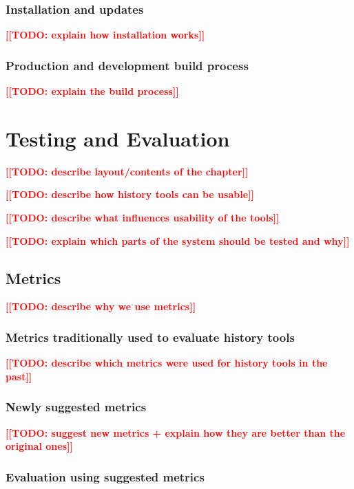 \documentclass[thesis=M,english]{FITthesis}[2012/10/20]
\newcommand{\todotext}[1]{\textcolor{red}{\textbf{[[#1]]}}}
\newcommand{\blind}[1][1]{\textcolor{mygray}{\Blindtext[#1][1]}}
\begin{document}
\blind

\subsection{Installation and updates}
\todotext{TODO: explain how installation works}

\blind

\subsection{Production and development build process}
\todotext{TODO: explain the build process}

\blind[2]


\chapter{Testing and Evaluation}

\todotext{TODO: describe layout/contents of the chapter}

\todotext{TODO: describe how history tools can be usable}

\todotext{TODO: describe what influences usability of the tools}

\todotext{TODO: explain which parts of the system should be tested and why}

\blind[3]

\section{Metrics}

\todotext{TODO: describe why we use metrics}

\subsection{Metrics traditionally used to evaluate history tools}

\todotext{TODO: describe which metrics were used for history tools in the past}

\subsection{Newly suggested metrics}

\todotext{TODO: suggest new metrics + explain how they are better than the original ones}

\subsection{Evaluation using suggested metrics}
\end{document}
